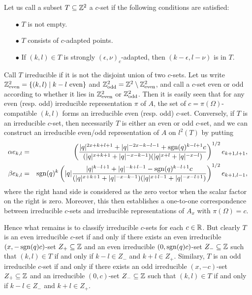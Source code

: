 Let us call a subset $T\subseteq \mathbb{Z}^2$ a $c$-set if the following conditions are satisfied: 
\begin{itemize} 
\item[$\bullet$] $T$ is not empty.
\item[$\bullet$] $T$ consists of $c$-adapted points.
\item[$\bullet$] If $(k,l)\in T$ is strongly $(\epsilon,\nu)_c$-adapted, then $(k-\epsilon,l-\nu)$ is in $T$.
\end{itemize}

Call $T$ irreducible if it is not the disjoint union of two $c$-sets.  Let us write $\mathbb{Z}^2_{\mathrm{even}} = \{(k,l)\mid k-l \textrm{ even}\}$ and $\mathbb{Z}^2_{\mathrm{odd}} = \mathbb{Z}^2\setminus \mathbb{Z}^2_{\mathrm{even}}$, and call a $c$-set even or odd according to whether it lies in $\mathbb{Z}^2_{\mathrm{even}}$ or $\mathbb{Z}^2_{\mathrm{odd}}$. Then it is easily seen that for any even (resp. odd) irreducible representation $\pi$ of $A$, the set of $c=\pi(\Omega)$-compatible $(k,l)$ forms an irreducible even (resp. odd) $c$-set. Conversely, if $T$ is an irreducible $c$-set, then necessarily $T$ is either an even or odd $c$-set, and we can construct an irreducible even/odd representation of $A$ on $l^2(T)$ by putting \begin{eqnarray*} \alpha e_{k,l} &=&  \left(\frac{|q|^{2x+k+l+1}+|q|^{-2x-k-l-1}+\operatorname{\mathrm{sgn}}(q)^{k-l+1}c}{(|q|^{x+k+1}+|q|^{-x-k-1})(|q|^{x+l}+|q|^{-x-l})}\right)^{1/2}e_{k+1,l+1},\\ \beta e_{k,l} &=& \operatorname{\mathrm{sgn}}(q)^{k}\left(|q|\frac{|q|^{k-l+1}+|q|^{-k+l-1}-\operatorname{\mathrm{sgn}}(q)^{k-l+1}c}{(|q|^{x+k+1}+|q|^{-x-k-1})(|q|^{x+l-1}+|q|^{-x-l+1})}\right)^{1/2} e_{k+1,l-1},\end{eqnarray*} where the right hand side is considered as the zero vector when the scalar factor on the right is zero. Moreover, this then establishes a one-to-one correspondence between irreducible $c$-sets and irreducible representations of $A_x$ with $\pi(\Omega) =c$.

Hence what remains is to classify irreducible $c$-sets for each $c\in \mathbb{R}$. But clearly $T$ is an even irreducible $c$-set if and only if there exists an even irreducible $(x,-\operatorname{\mathrm{sgn}}(q)c)$-set $Z_+\subseteq \mathbb{Z}$ and an even irreducible $(0,\operatorname{\mathrm{sgn}}(q)c)$-set $Z_-\subseteq \mathbb{Z}$ such that $(k,l)\in T$ if and only if $k-l\in Z_-$ and $k+l\in Z_+$. Similary, $T$ is an odd irreducible $c$-set if and only if there exists an odd irreducible $(x,-c)$-set $Z_+\subseteq \mathbb{Z}$ and an irreducible $(0,c)$-set $Z_-\subseteq \mathbb{Z}$ such that $(k,l)\in T$ if and only if $k-l\in Z_-$ and $k+l\in Z_+$.



